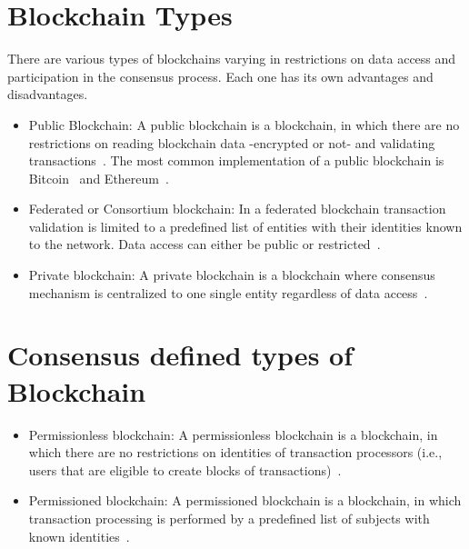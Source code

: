 \section{Blockchain Types}\label{blockchain:blockchain_types}

There are various types of blockchains varying in restrictions on data access and participation in the consensus process. Each one has its own advantages and disadvantages.

\begin{itemize}
  \item Public Blockchain: A public blockchain is a blockchain, in which there are no restrictions on reading blockchain data -encrypted or not- and validating transactions~\cite{prbc_vs_pubbc}.
  The most common implementation of a public blockchain is Bitcoin~\cite{nakamoto2012bitcoin} and Ethereum~\cite{ethash}.
  \item Federated or Consortium blockchain: In a federated blockchain transaction validation is limited to a predefined list of entities with their identities known to the network. Data access can either be public or restricted~\cite{prbc_vs_pubbc}.
  \item Private blockchain: A private blockchain is a blockchain where consensus mechanism is centralized to one single entity regardless of data access~\cite{prbc_vs_pubbc}.
\end{itemize}

\section{Consensus defined types of Blockchain}\label{blockchain:consensus_blockchain_types}

\begin{itemize}
  \item Permissionless blockchain: A permissionless blockchain is a blockchain, in which there are no restrictions on identities of transaction processors (i.e., users that are eligible to create blocks of transactions)~\cite{prbc_vs_pubbc}.
  \item Permissioned blockchain: A permissioned blockchain is a blockchain, in which transaction processing is performed by a predefined list of subjects with known identities~\cite{prbc_vs_pubbc}.
\end{itemize}


